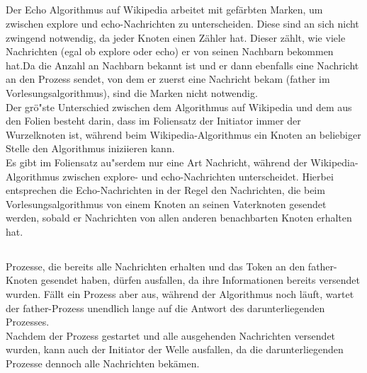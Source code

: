 \documentclass[a4paper,9pt]{article}
\begin{document}
\subsection{}
Der Echo Algorithmus auf Wikipedia arbeitet mit gef\"arbten Marken, um zwischen explore und echo-Nachrichten zu unterscheiden. Diese sind an sich nicht zwingend notwendig, da jeder Knoten einen Z\"ahler hat. Dieser z\"ahlt, wie viele Nachrichten (egal ob explore oder echo) er von seinen Nachbarn bekommen hat.Da die Anzahl an Nachbarn bekannt ist und er dann ebenfalls eine Nachricht an den Prozess sendet, von dem er zuerst eine Nachricht bekam (father im Vorlesungsalgorithmus), sind die Marken nicht notwendig. \\
Der gr\"o"ste Unterschied zwischen dem Algorithmus auf Wikipedia und dem aus den Folien besteht darin, dass im Foliensatz der Initiator immer der Wurzelknoten ist, w\"ahrend beim Wikipedia-Algorithmus ein Knoten an beliebiger Stelle den Algorithmus iniziieren kann. \\
Es gibt im Foliensatz au"serdem nur eine Art Nachricht, w\"ahrend der Wikipedia-Algorithmus zwischen explore- und echo-Nachrichten unterscheidet. Hierbei entsprechen die Echo-Nachrichten in der Regel den Nachrichten, die beim Vorlesungsalgorithmus von einem Knoten an seinen Vaterknoten gesendet werden, sobald er Nachrichten von allen anderen benachbarten Knoten erhalten hat.

\subsection{}
Prozesse, die bereits alle Nachrichten erhalten und das Token an den father-Knoten gesendet haben, d\"urfen ausfallen, da ihre Informationen bereits versendet wurden. F\"allt ein Prozess aber aus, w\"ahrend der Algorithmus noch l\"auft, wartet der father-Prozess unendlich lange auf die Antwort des darunterliegenden Prozesses. \\
Nachdem der Prozess gestartet und alle ausgehenden Nachrichten versendet wurden, kann auch der Initiator der Welle ausfallen, da die darunterliegenden Prozesse dennoch alle Nachrichten bek\"amen.

\subsection{}
\end{document}
